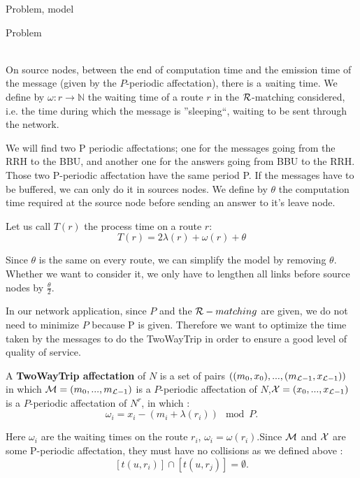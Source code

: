 \documentclass[a4paper,10pt]{report}
\begin{document}
\begin{chapter}{Problem, model}
\begin{section}{Problem}
{{\begin{center}
{
}
\end{center}}}\\

On source nodes, between the end of computation time and the emission time of the message (given by the $P$-periodic affectation), there is a {\emph waiting time}. 
We define by $\omega : r \rightarrow \mathbb{N}$ the waiting time of a route $r$ in the ${\cal R}$-matching considered, i.e. the time during which the
message is ''sleeping``, waiting to be sent through the network.


We will find two P periodic affectations; one for the messages going from the RRH to the BBU, and another one for the answers going from BBU to the RRH. Those two P-periodic affectation have the same period P. 
If the messages have to be buffered, we can only do it in sources nodes.
We define by $\theta$ the computation time required at the source node before sending an answer to it's leave node.

Let us call $T (r)$ the process time on a route $r$: $$ T (r) = 2\lambda (r) + \omega (r) + \theta$$

Since $\theta$ is the same on every route, we can simplify the model by removing $\theta$. Whether we want to consider it, we only have to lengthen all 
links before source nodes by $\frac{\theta}{2}$. 


In our network application, since $P$ and the ${\cal R}-matching$ are given, we do not need to minimize $P$ because P is given.
Therefore we want to optimize the time taken by the messages to do the TwoWayTrip in order to ensure a good level of quality of service.

A {\bf TwoWayTrip affectation} of $N$ is a set of pairs $ ((m_0,x_0),...,(m_{{\cal L}-1},x_{{\cal L}-1}))$ in which ${\cal M} = (m_0,...,m_{{\cal L}-1})$ 
is a $P$-periodic affectation of $N$,${\cal X} = (x_0,...,x_{{\cal L}-1})$ is a $P$-periodic affectation of $N^r$, in which :
$$ \omega_i = x_i - (m_i + \lambda(r_i)) \mod P .$$ 

Here $\omega_i$ are the waiting times on the route $r_i$, $\omega_i = \omega(r_i)$.Since ${\cal M}$ and ${\cal X}$
are some P-periodic affectation, they must have no collisions as we defined above :
$$[t(u,r_i)] \cap [t(u,r_j)] = \emptyset .$$


\end{section}
\end{chapter}
\end{document}
